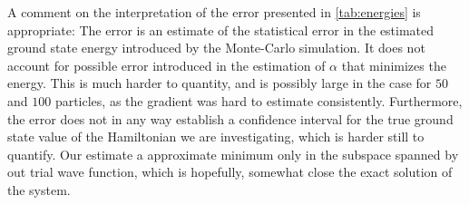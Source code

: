 A comment on the interpretation of the error presented in \autoref{tab:energies} is appropriate:
The error is an estimate of the statistical error in the estimated ground state
energy introduced by the Monte-Carlo simulation. It does not account for
possible error introduced in the estimation of $\alpha$ that minimizes the
energy. This is much harder to quantity, and is possibly large in the case for
$50$ and $100$ particles, as the gradient was hard to estimate consistently.
Furthermore, the error does not in any way establish a confidence interval for
the true ground state value of the Hamiltonian we are investigating, which is
harder still to quantify. Our estimate a approximate minimum only in the
subspace spanned by out trial wave function, which is hopefully, somewhat close
the exact solution of the system.








